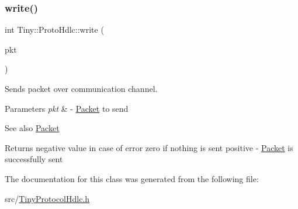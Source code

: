 \subsubsection{\texorpdfstring{write()}{write()}\hspace{0.1cm}{\footnotesize\ttfamily [2/2]}}
{\footnotesize\ttfamily int Tiny\+::\+Proto\+Hdlc\+::write (\begin{DoxyParamCaption}\item[{\hyperlink{classTiny_1_1IPacket}{I\+Packet} \&}]{pkt }\end{DoxyParamCaption})}

Sends packet over communication channel. 
\begin{DoxyParams}{Parameters}
{\em pkt} & -\/ \hyperlink{classTiny_1_1Packet}{Packet} to send \\
\hline
\end{DoxyParams}
\begin{DoxySeeAlso}{See also}
\hyperlink{classTiny_1_1Packet}{Packet} 
\end{DoxySeeAlso}
\begin{DoxyReturn}{Returns}
negative value in case of error zero if nothing is sent positive -\/ \hyperlink{classTiny_1_1Packet}{Packet} is successfully sent 
\end{DoxyReturn}


The documentation for this class was generated from the following file\+:\begin{DoxyCompactItemize}
\item 
src/\hyperlink{TinyProtocolHdlc_8h}{Tiny\+Protocol\+Hdlc.\+h}\end{DoxyCompactItemize}
